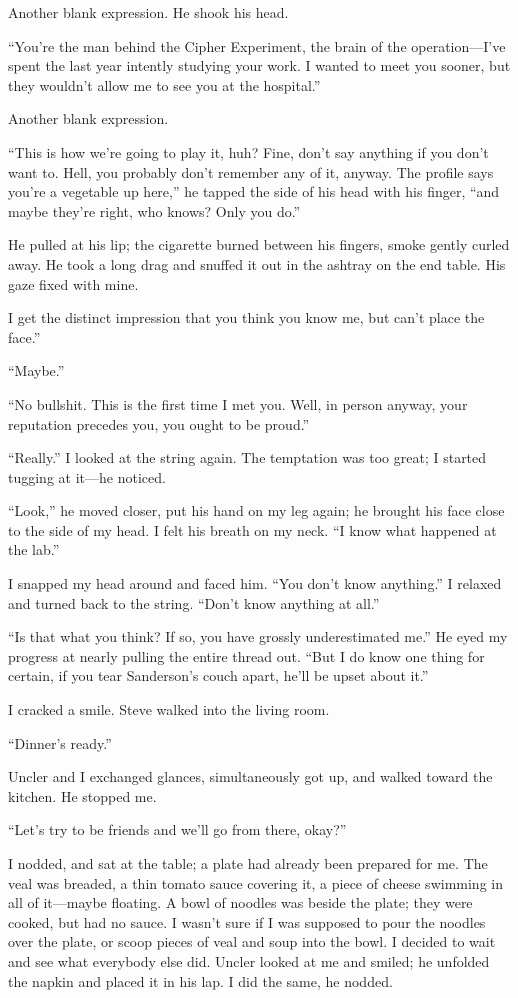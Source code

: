 Another blank expression. He shook his head.

``You're the man behind the Cipher Experiment, the brain of the
operation---I've spent the last year intently studying your work. I
wanted to meet you sooner, but they wouldn't allow me to see you at the
hospital.''

Another blank expression.

``This is how we're going to play it, huh? Fine, don't say anything if
you don't want to. Hell, you probably don't remember any of it, anyway.
The profile says you're a vegetable up here,'' he tapped the side of his
head with his finger, ``and maybe they're right, who knows? Only you
do.''

He pulled at his lip; the cigarette burned between his fingers, smoke
gently curled away. He took a long drag and snuffed it out in the
ashtray on the end table. His gaze fixed with mine.

I get the distinct impression that you think you know me, but can't
place the face.''

``Maybe.''

``No bullshit. This is the first time I met you. Well, in person anyway,
your reputation precedes you, you ought to be proud.''

``Really.'' I looked at the string again. The temptation was too great;
I started tugging at it---he noticed.

``Look,'' he moved closer, put his hand on my leg again; he brought his
face close to the side of my head. I felt his breath on my neck. ``I
know what happened at the lab.''

I snapped my head around and faced him. ``You don't know anything.'' I
relaxed and turned back to the string. ``Don't know anything at all.''

``Is that what you think? If so, you have grossly underestimated me.''
He eyed my progress at nearly pulling the entire thread out. ``But I do
know one thing for certain, if you tear Sanderson's couch apart, he'll
be upset about it.''

I cracked a smile. Steve walked into the living room.

``Dinner's ready.''

Uncler and I exchanged glances, simultaneously got up, and walked toward
the kitchen. He stopped me.

``Let's try to be friends and we'll go from there, okay?''

I nodded, and sat at the table; a plate had already been prepared for
me. The veal was breaded, a thin tomato sauce covering it, a piece of
cheese swimming in all of it---maybe floating. A bowl of noodles was
beside the plate; they were cooked, but had no sauce. I wasn't sure if I
was supposed to pour the noodles over the plate, or scoop pieces of veal
and soup into the bowl. I decided to wait and see what everybody else
did. Uncler looked at me and smiled; he unfolded the napkin and placed
it in his lap. I did the same, he nodded.

